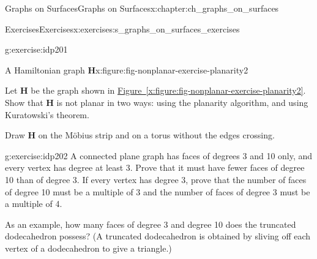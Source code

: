 \documentclass[oneside,10pt,]{book}
\newcommand{\xreffont}{\relax}
\numberwithin{equation}{section}
\newcommand{\bfH}{\mathbf{H}}
\begin{document}
\begin{chapterptx}{Graphs on Surfaces}{}{Graphs on Surfaces}{}{}{x:chapter:ch_graphs_on_surfaces}
\begin{exercises-section}{Exercises}{}{Exercises}{}{}{x:exercises:s_graphs_on_surfaces_exercises}
\begin{divisionexercise}{4}{}{}{g:exercise:idp201}
\begin{figureptx}{A Hamiltonian graph \(\bfH\)}{x:figure:fig-nonplanar-exercise-planarity2}{}
\begin{image}{0.15}{0.7}{0.15}
{
}%
\end{image}%
\tcblower
\end{figureptx}%
Let \(\bfH\) be the graph shown in \hyperref[x:figure:fig-nonplanar-exercise-planarity2]{Figure~{\xreffont\ref{x:figure:fig-nonplanar-exercise-planarity2}}}.  Show that \(\bfH\) is not planar in two ways: using the planarity algorithm, and using Kuratowski's theorem.%
\par
Draw \(\bfH\) on the Möbius strip and on a torus without the edges crossing.%
\end{divisionexercise}%
\begin{divisionexercise}{5}{}{}{g:exercise:idp202}%
A connected plane graph has faces of degrees 3 and 10 only, and every vertex has degree at least 3.  Prove that it must have fewer faces of degree 10 than of degree 3.  If every vertex has degree 3, prove that the number of faces of degree 10 must be a multiple of 3 and the number of faces of degree 3 must be a multiple of 4.%
\par
As an example, how many faces of degree 3 and degree 10 does the truncated dodecahedron possess?  (A truncated dodecahedron is obtained by sliving off each vertex of a dodecahedron to give a triangle.)%
\end{divisionexercise}%
\end{exercises-section}
\end{chapterptx}
%
%
\typeout{************************************************}
\typeout{************************************************}
%
\end{document}
